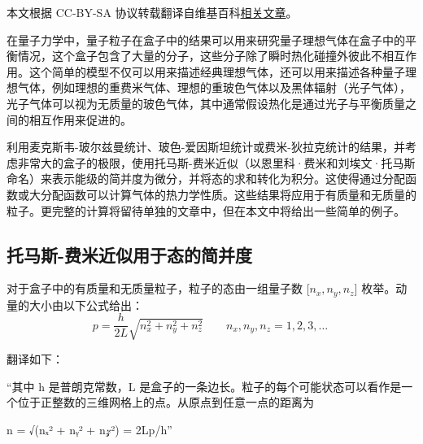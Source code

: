 
本文根据 CC-BY-SA 协议转载翻译自维基百科\href{https://en.wikipedia.org/wiki/Gas_in_a_box}{相关文章}。

在量子力学中，量子粒子在盒子中的结果可以用来研究量子理想气体在盒子中的平衡情况，这个盒子包含了大量的分子，这些分子除了瞬时热化碰撞外彼此不相互作用。这个简单的模型不仅可以用来描述经典理想气体，还可以用来描述各种量子理想气体，例如理想的重费米气体、理想的重玻色气体以及黑体辐射（光子气体），光子气体可以视为无质量的玻色气体，其中通常假设热化是通过光子与平衡质量之间的相互作用来促进的。

利用麦克斯韦-玻尔兹曼统计、玻色-爱因斯坦统计或费米-狄拉克统计的结果，并考虑非常大的盒子的极限，使用托马斯-费米近似（以恩里科·费米和刘埃文·托马斯命名）来表示能级的简并度为微分，并将态的求和转化为积分。这使得通过分配函数或大分配函数可以计算气体的热力学性质。这些结果将应用于有质量和无质量的粒子。更完整的计算将留待单独的文章中，但在本文中将给出一些简单的例子。
\subsection{托马斯-费米近似用于态的简并度}  
对于盒子中的有质量和无质量粒子，粒子的态由一组量子数 [\(n_x, n_y, n_z\)] 枚举。动量的大小由以下公式给出：
\[
p = \frac{h}{2L} \sqrt{n_x^2 + n_y^2 + n_z^2} \quad \quad n_x, n_y, n_z = 1, 2, 3, \ldots~
\]

翻译如下：

“其中 h 是普朗克常数，L 是盒子的一条边长。粒子的每个可能状态可以看作是一个位于正整数的三维网格上的点。从原点到任意一点的距离为

n = √(nₓ² + nᵧ² + n𝓏²) = 2Lp/h”